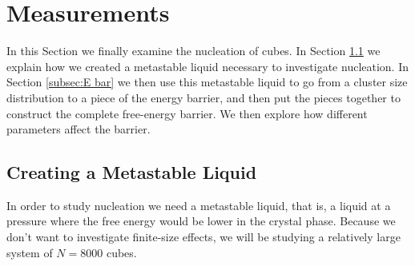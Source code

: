 \documentclass[thesis]{subfiles}
\begin{document}
\section{Measurements}

In this Section we finally examine the nucleation of cubes. In Section \ref{subsec:supsatliq} we explain how we created a metastable liquid necessary to investigate nucleation. In Section \ref{subsec:E bar} we then use this metastable liquid to go from a cluster size distribution to a piece of the energy barrier, and then put the pieces together to construct the complete free-energy barrier. We then explore how different parameters affect the barrier.

\subsection{Creating a Metastable Liquid}\label{subsec:supsatliq}

In order to study nucleation we need a metastable liquid, that is, a liquid at a pressure where the free energy would be lower in the crystal phase. Because we don't want to investigate finite-size effects, we will be studying a relatively large system of $N = 8000$ cubes.\\
\end{document}
